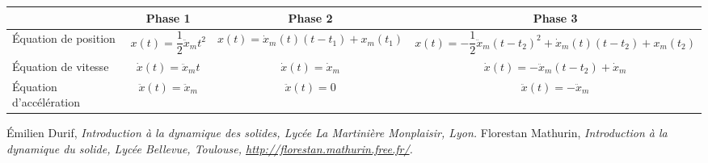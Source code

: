 \documentclass[10pt,fleqn]{article} %
\begin{document}
\begin{center}
\begin{tabular}{|p{2.2cm}|c|c|c|}
\hline
 & Phase 1 & Phase 2 & Phase 3 \\
\hline \hline
Équation de position & 
$x(t)=\dfrac{1}{2}\ddot{x}_mt^2 $ &
$x(t)= \dot{x}_m(t)\left( t-t_1\right)+x_m\left(t_1 \right)$ & 
$x(t)= -\dfrac{1}{2}\ddot{x}_m\left(t-t_2\right)^2 + \dot{x}_m(t)\left( t-t_2\right)+x_m\left(t_2\right)$ \\ \hline
Équation de vitesse &
$\dot{x}(t)=\ddot{x}_m t$ &  
$\dot{x}(t)=\dot{x}_m $ & 
$\dot{x}(t)=-\ddot{x}_m \left(t-t_2\right)+\dot{x}_m$  \\ \hline
Équation d'accélération &
$\ddot{x}(t)=\ddot{x}_m$ & 
$\ddot{x}(t)=0$ & 
$\ddot{x}(t)=-\ddot{x}_m$ \\
\hline
\end{tabular}
\end{center}

\begin{thebibliography}{2}
    Émilien Durif, {\it Introduction à la dynamique des solides, Lycée La Martinière Monplaisir, Lyon.}
       Florestan Mathurin, {\it Introduction à la dynamique du solide, Lycée Bellevue, Toulouse, \url{http://florestan.mathurin.free.fr/}.}



\end{thebibliography}
\end{document}
